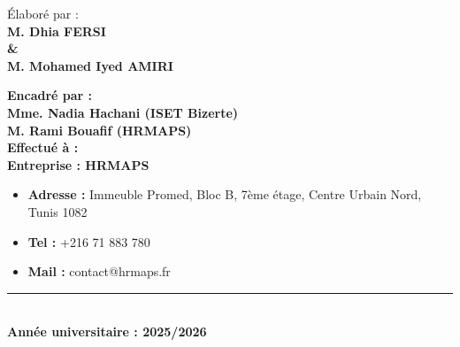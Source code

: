 \vspace{0.3cm}
\begin{center}
\end{center}

\begin{center}
    \vspace{0.3cm}
    {\large Élaboré par :}\\[0.1cm]
    {\large\bfseries M. Dhia FERSI}\\[0.02cm]
    {\small\bfseries \&}\\[0.02cm]
    {\large\bfseries M. Mohamed Iyed AMIRI}\\
\end{center}

\vspace{0.3cm}

\noindent
\begin{minipage}[t]{\textwidth}
    \raggedright
    {\large\bfseries Encadré par :}\\[0.1cm]
    \textbf{Mme. Nadia Hachani (ISET Bizerte)} \\
    \textbf{M. Rami Bouafif (HRMAPS)} \\
    
    \vspace{0.3cm}
    {\large\bfseries Effectué à :}\\[0.1cm]
    \textbf{Entreprise : HRMAPS}
    \begin{itemize}[leftmargin=0.4cm, label=\textbullet, noitemsep, topsep=1pt]
        \item \textbf{Adresse :} Immeuble Promed, Bloc B, 7ème étage, Centre Urbain Nord, Tunis 1082
        \item \textbf{Tel :} +216 71 883 780
        \item \textbf{Mail :} contact@hrmaps.fr
    \end{itemize}
\end{minipage}

\vfill

\begin{center}
    \rule{0.3\linewidth}{0.6pt}\\[0.1cm]
    {\large\bfseries Année universitaire : 2025/2026}
\end{center}
